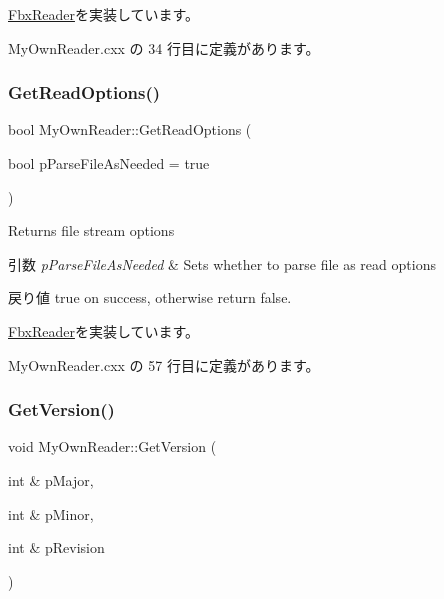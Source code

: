 \hyperlink{class_fbx_reader_a6105bd37ae86c03f35aee6f62901856d}{Fbx\+Reader}を実装しています。



 My\+Own\+Reader.\+cxx の 34 行目に定義があります。

\mbox{\label{class_my_own_reader_a0ce8b8bc4f216b5e87574796aa973219}} 
\subsubsection{\texorpdfstring{Get\+Read\+Options()}{GetReadOptions()}}
{\footnotesize\ttfamily bool My\+Own\+Reader\+::\+Get\+Read\+Options (\begin{DoxyParamCaption}\item[{bool}]{p\+Parse\+File\+As\+Needed = {\ttfamily true} }\end{DoxyParamCaption})\hspace{0.3cm}{\ttfamily [virtual]}}

Returns file stream options 
\begin{DoxyParams}{引数}
{\em p\+Parse\+File\+As\+Needed} & Sets whether to parse file as read options \\
\hline
\end{DoxyParams}
\begin{DoxyReturn}{戻り値}
true on success, otherwise return false. 
\end{DoxyReturn}


\hyperlink{class_fbx_reader_acea3c118db490378c9aed17512396932}{Fbx\+Reader}を実装しています。



 My\+Own\+Reader.\+cxx の 57 行目に定義があります。

\mbox{\label{class_my_own_reader_aa57a92ed234912fb6d570a03fe265124}} 
\subsubsection{\texorpdfstring{Get\+Version()}{GetVersion()}}
{\footnotesize\ttfamily void My\+Own\+Reader\+::\+Get\+Version (\begin{DoxyParamCaption}\item[{int \&}]{p\+Major,  }\item[{int \&}]{p\+Minor,  }\item[{int \&}]{p\+Revision }\end{DoxyParamCaption})\hspace{0.3cm}{\ttfamily [virtual]}}

